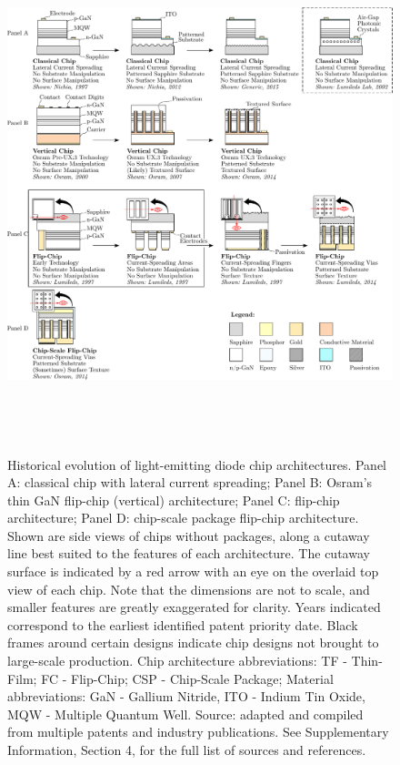 \documentclass[journal=jacsat,manuscript=article]{achemso}
\begin{document}
\clearpage
\begin{figure}[h!]
 \centering
 \includegraphics[height=15cm]{figures/chip_architecture_overview.pdf}
 \caption{Historical evolution of light-emitting diode chip architectures. Panel A: classical chip with lateral current spreading; Panel B: Osram’s thin GaN flip-chip (vertical) architecture; Panel C: flip-chip architecture; Panel D: chip-scale package flip-chip architecture. Shown are side views of chips without packages, along a cutaway line best suited to the features of each architecture. The cutaway surface is indicated by a red arrow with an eye on the overlaid top view of each chip. Note that the dimensions are not to scale, and smaller features are greatly exaggerated for clarity. Years indicated correspond to the earliest identified patent priority date. Black frames around certain designs indicate chip designs not brought to large-scale production. Chip architecture abbreviations: TF - Thin-Film; FC - Flip-Chip; CSP - Chip-Scale Package; Material abbreviations: GaN - Gallium Nitride, ITO - Indium Tin Oxide, MQW - Multiple Quantum Well. Source: adapted and compiled from multiple patents and industry publications. See Supplementary Information, Section 4, for the full list of sources and references.}
 \label{fgr:chip_architecture_overview}
\end{figure}
\end{document}
